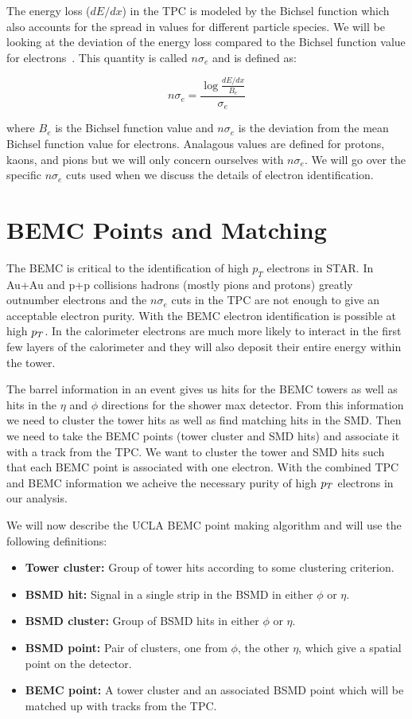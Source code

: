 The energy loss ($dE/dx$) in the TPC is modeled by the Bichsel function which also accounts for the spread in values for different particle species. We will be looking at the deviation of the energy loss compared to the Bichsel function value for electrons~\cite{bichsel}. This quantity is called $n\sigma_e$ and is defined as:

\begin{equation}\label{eq:nsigmae}
n\sigma_e = \frac{\log{\frac{dE/dx}{B_e}}}{\sigma_e}
\end{equation}

where $B_e$ is the Bichsel function value and $n\sigma_e$ is the deviation from the mean Bichsel function value for electrons. Analagous values are defined for protons, kaons, and pions but we will only concern ourselves with $n\sigma_e$. We will go over the specific $n\sigma_e$ cuts used when we discuss the details of electron identification. 

\section{BEMC Points and Matching}

The BEMC is critical to the identification of high $p_T$ electrons in STAR. In Au+Au and p+p collisions hadrons (mostly pions and protons) greatly outnumber electrons and the $n\sigma_e$ cuts in the TPC are not enough to give an acceptable electron purity. With the BEMC electron identification is possible at high $p_{T}$. In the calorimeter electrons are much more likely to interact in the first few layers of the calorimeter and they will also deposit their entire energy within the tower. 

The barrel information in an event gives us hits for the BEMC towers as well as hits in the $\eta$ and $\phi$ directions for the shower max detector. From this information we need to cluster the tower hits as well as find matching hits in the SMD. Then we need to take the BEMC points (tower cluster and SMD hits) and associate it with a track from the TPC. We want to cluster the tower and SMD hits such that each BEMC point is associated with one electron. With the combined TPC and BEMC information we acheive the necessary purity of high $p_{T}$ electrons in our analysis.

We will now describe the UCLA BEMC point making algorithm and will use the following definitions: 

\begin{itemize}
\item \textbf{Tower cluster:} Group of tower hits according to some clustering criterion.
\item \textbf{BSMD hit:} Signal in a single strip in the BSMD in either $\phi$ or $\eta$.
\item \textbf{BSMD cluster:} Group of BSMD hits in either $\phi$ or $\eta$.
\item \textbf{BSMD point:} Pair of clusters, one from $\phi$, the other $\eta$, which give a spatial point on the detector.
\item \textbf{BEMC point:} A tower cluster and an associated BSMD point which will be matched up with tracks from the TPC.
\end{itemize}

